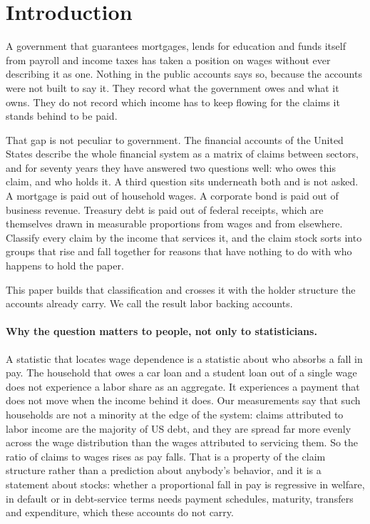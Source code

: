 \section{Introduction}
\label{sec:intro}

A government that guarantees mortgages, lends for education and funds itself from payroll and
income taxes has taken a position on wages without ever describing it as one. Nothing in the
public accounts says so, because the accounts were not built to say it. They record what the
government owes and what it owns. They do not record which income has to keep flowing for the
claims it stands behind to be paid.

That gap is not peculiar to government. The financial accounts of the United States describe the
whole financial system as a matrix of claims between sectors, and for seventy years they have
answered two questions well: who owes this claim, and who holds it. A third question sits
underneath both and is not asked. A mortgage is paid out of household wages. A corporate bond is
paid out of business revenue. Treasury debt is paid out of federal receipts, which are themselves
drawn in measurable proportions from wages and from elsewhere. Classify every claim by the income
that services it, and the claim stock sorts into groups that rise and fall together for reasons
that have nothing to do with who happens to hold the paper.

This paper builds that classification and crosses it with the holder structure the accounts
already carry. We call the result labor backing accounts.

\paragraph{Why the question matters to people, not only to statisticians.} A statistic that
locates wage dependence is a statistic about who absorbs a fall in pay. The household that owes
a car loan and a student loan out of a single wage does not experience a labor share as an
aggregate. It experiences a payment that does not move when the income behind it does. Our
measurements say that such households are not a minority at the edge of the system: claims
attributed to labor income are the majority of US debt, and they are spread far more evenly
across the wage distribution than the wages attributed to servicing them. So the ratio of
claims to wages rises as pay falls. That is a property of the claim structure rather than a
prediction about anybody's behavior, and it is a statement about stocks: whether a
proportional fall in pay is regressive in welfare, in default or in debt-service terms needs
payment schedules, maturity, transfers and expenditure, which these accounts do not carry.


